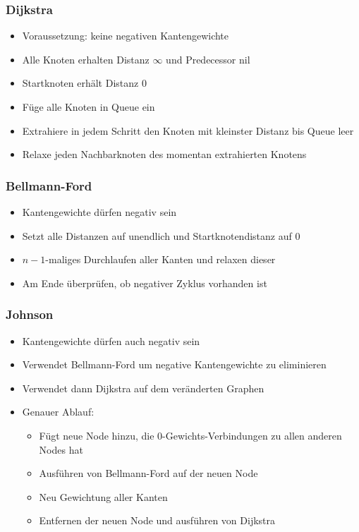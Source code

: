         \subsubsection{Dijkstra}
            \begin{itemize}
                \item Voraussetzung: keine negativen Kantengewichte
                \item Alle Knoten erhalten Distanz $\infty$ und Predecessor nil
                \item Startknoten erhält Distanz 0
                \item Füge alle Knoten in Queue ein 
                \item Extrahiere in jedem Schritt den Knoten mit kleinster Distanz bis Queue leer
                \item Relaxe jeden Nachbarknoten des momentan extrahierten Knotens
            \end{itemize}
        \subsubsection{Bellmann-Ford}
            \begin{itemize}
                \item Kantengewichte dürfen negativ sein
                \item Setzt alle Distanzen auf unendlich und Startknotendistanz auf 0
                \item $n-1$-maliges Durchlaufen aller Kanten und relaxen dieser
                \item Am Ende überprüfen, ob negativer Zyklus vorhanden ist
            \end{itemize}
        \subsubsection{Johnson}
            \begin{itemize}
                \item Kantengewichte dürfen auch negativ sein
                \item Verwendet Bellmann-Ford um negative Kantengewichte zu eliminieren
                \item Verwendet dann Dijkstra auf dem veränderten Graphen
                \item Genauer Ablauf:
                    \begin{itemize}
                        \item Fügt neue Node hinzu, die 0-Gewichts-Verbindungen zu allen anderen Nodes hat
                        \item Ausführen von Bellmann-Ford auf der neuen Node
                        \item Neu Gewichtung aller Kanten
                        \item Entfernen der neuen Node und ausführen von Dijkstra
                    \end{itemize}
            \end{itemize}
